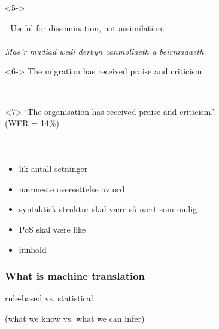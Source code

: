 \documentclass{beamer}
\begin{document}
\begin{frame}
\begin{onlyenv}<5->

- Useful for dissemination, not assimilation:\\
~\\
\emph{Mae'r \alert<7>{mudiad} wedi derbyn canmoliaeth a beirniadaeth.}\\
\end{onlyenv}

\begin{onlyenv}<6->
The \alert<7>{migration} has received praise and criticism.\\
\end{onlyenv}

~\\
\begin{onlyenv}<7>
`The \alert<7>{organisation} has received praise and criticism.'\\ (WER = 14\%)\\
\end{onlyenv}

~\\

\end{frame}

\begin{frame}
\frametitle{}
\begin{itemize}
  \item lik antall setninger
  \item nærmeste oversettelse av ord
  \item syntaktisk struktur skal være så nært som mulig
  \item PoS skal være like
  \item innhold
\end{itemize}
\end{frame}


\begin{frame}
\frametitle{What is machine translation}

  \begin{centering}

    {\Large rule-based vs. statistical}

    (what we know vs. what we can infer)

  \end{centering}

\end{frame}
\end{document}
